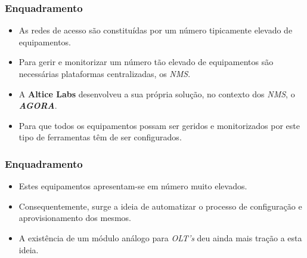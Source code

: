\begin{frame}
    \frametitle{Enquadramento}
    \begin{itemize} 
        \item As redes de acesso são constituídas por um número tipicamente
        elevado de equipamentos.
        \item Para gerir e monitorizar um número tão elevado de equipamentos são
        necessárias plataformas centralizadas, os \textit{NMS}.
        \item A \textbf{Altice Labs} desenvolveu a sua própria solução, no
        contexto dos \textit{NMS}, o \textit{\textbf{AGORA}}. 
        \item Para que todos os equipamentos possam ser geridos e monitorizados
        por este tipo de ferramentas têm de ser configurados. 
    \end{itemize}
\end{frame}

\begin{frame}
    \frametitle{Enquadramento}
    \begin{itemize}
        \item Estes equipamentos apresentam-se em número muito elevados.   
        \item Consequentemente, surge a ideia de automatizar o processo de
        configuração e aprovisionamento dos mesmos.
        \item A existência de um módulo análogo para \textit{OLT's} deu ainda
        mais tração a esta ideia.
    \end{itemize}
\end{frame}

